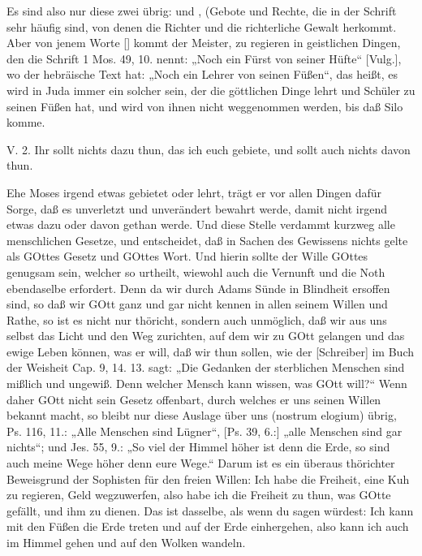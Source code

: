 Es sind also nur diese zwei übrig:  und , (Gebote und Rechte, die in der Schrift sehr häufig sind, von denen die Richter und die richterliche Gewalt herkommt. Aber von jenem Worte [] kommt der Meister, zu regieren in geistlichen Dingen, den die Schrift 1 Mos. 49, 10.  nennt: „Noch ein Fürst von seiner Hüfte“ [Vulg.], wo der hebräische Text hat: „Noch ein Lehrer von seinen Füßen“, das heißt, es wird in Juda immer ein solcher sein, der die göttlichen Dinge lehrt und Schüler zu seinen Füßen hat, und wird von ihnen nicht weggenommen werden, bis daß Silo komme.

\begin{schriftzitat}
V. 2. Ihr sollt nichts dazu thun, das ich euch gebiete, und sollt auch nichts davon thun.
\end{schriftzitat}

Ehe Moses irgend etwas gebietet oder lehrt, trägt er vor allen Dingen dafür Sorge, daß es unverletzt und unverändert bewahrt werde, damit nicht irgend etwas dazu oder davon gethan werde. Und diese Stelle verdammt kurzweg alle menschlichen Gesetze, und entscheidet, daß in Sachen des Gewissens nichts gelte als GOttes Gesetz und GOttes Wort. Und hierin sollte der Wille GOttes genugsam sein, welcher so urtheilt, wiewohl auch die Vernunft und die Noth ebendaselbe erfordert. Denn da wir durch Adams Sünde in Blindheit ersoffen sind, so daß wir GOtt ganz und gar nicht kennen in allen seinem Willen und Rathe, so ist es nicht nur thöricht, sondern auch unmöglich, daß wir aus uns selbst das Licht und den Weg zurichten, auf dem wir zu GOtt gelangen und das ewige Leben können, was er will, daß wir thun sollen, wie der [Schreiber] im Buch der Weisheit Cap. 9, 14. 13. sagt: „Die Gedanken der sterblichen Menschen sind mißlich und ungewiß. Denn welcher Mensch kann wissen, was GOtt will?“ Wenn daher GOtt nicht sein Gesetz offenbart, durch welches er uns seinen Willen bekannt macht, so bleibt nur diese Auslage über uns (nostrum elogium) übrig, Ps. 116, 11.: „Alle Menschen sind Lügner“, [Ps. 39, 6.:] „alle Menschen sind gar nichts“; und Jes. 55, 9.: „So viel der Himmel höher ist denn die Erde, so sind auch meine Wege höher denn eure Wege.“ Darum ist es ein überaus thörichter Beweisgrund der Sophisten für den freien Willen: Ich habe die Freiheit, eine Kuh zu regieren, Geld wegzuwerfen, also habe ich die Freiheit zu thun, was GOtte gefällt, und ihm zu dienen. Das ist dasselbe, als wenn du sagen würdest: Ich kann mit den Füßen die Erde treten und auf der Erde einhergehen, also kann ich auch im Himmel gehen und auf den Wolken wandeln.

